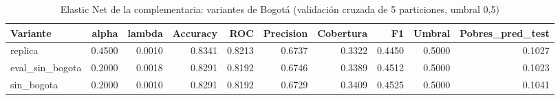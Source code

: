 \begin{table}[ht]
\centering
\begin{tabular}{lrrrrrrrrr}
  \toprule
Variante & alpha & lambda & Accuracy & ROC & Precision & Cobertura & F1 & Umbral & Pobres\_pred\_test \\ 
  \midrule
replica & 0.4500 & 0.0010 & 0.8341 & 0.8213 & 0.6737 & 0.3322 & 0.4450 & 0.5000 & 0.1027 \\ 
  eval\_sin\_bogota & 0.2000 & 0.0018 & 0.8291 & 0.8192 & 0.6746 & 0.3389 & 0.4512 & 0.5000 & 0.1023 \\ 
  sin\_bogota & 0.2000 & 0.0010 & 0.8291 & 0.8192 & 0.6729 & 0.3409 & 0.4525 & 0.5000 & 0.1041 \\ 
   \bottomrule
\end{tabular}
\caption{Elastic Net de la complementaria: variantes de Bogot\'a (validaci\'on cruzada de 5 particiones, umbral 0,5)} 
\label{tab:elastic_net_cv_results}
\end{table}
